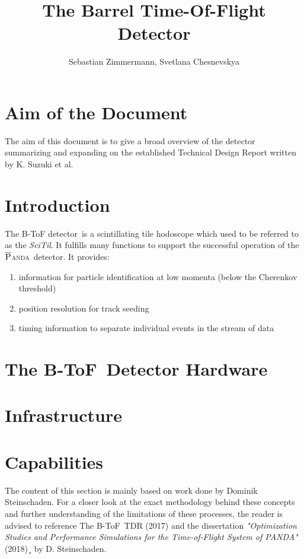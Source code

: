\documentclass[12pt,a4paper,oneside]{article}
\author{Sebastian Zimmermann, Svetlana Chesnevskya}
\title{The Barrel Time-Of-Flight Detector}
\newcommand{\panda}{\textsc{$\overline{\textsc{P}}$anda}}
\newcommand{\btof}{B-ToF}
\newcommand{\btofD}{B-ToF detector}
\begin{document}
\maketitle

\section*{Aim of the Document}
The aim of this document is to give a broad overview of the detector summarizing and expanding on the established Technical Design Report written by K. Suzuki et al.

\tableofcontents
\newpage

\section{Introduction}

The \btofD\ is a scintillating tile hodoscope which used to be referred to as the \emph{SciTil}. It fulfills many functions to support the successful operation of the \panda\ detector. It provides:
\begin{enumerate}[I]
	\item	information for particle identification at low momenta (below the Cherenkov threshold)
	\item	position resolution for track seeding
	\item	timing information to separate individual events in the stream of data
\end{enumerate}


\section{The \btof\ Detector Hardware}


\section{Infrastructure}


\section{Capabilities}

The content of this section is mainly based on work done by Dominik Steinschaden.
For a closer look at the exact methodology behind these concepts and further understanding of the limitations of these processes, the reader is advised to reference The \btof\ TDR (2017) and the dissertation \emph{"Optimization Studies and Performance Simulations for the Time-of-Flight System of PANDA"} (2018)¸ by D. Steinschaden.
\end{document}
